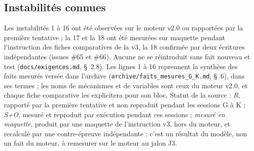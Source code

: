 \documentclass[11pt,a4paper]{article}
\begin{document}
\subsection*{Instabilités connues}
Les instabilités 1 à 16 ont été observées sur le moteur v2.0 ou rapportées par la première tentative ; la 17 et la 18 ont été mesurées sur maquette pendant l'instruction des fiches comparatives de la v3, la 18 confirmée par deux écritures indépendantes (issues \#65 et \#66). Aucune ne se réintroduit sans fait nouveau et test (\nolinkurl{docs/exigences.md}, \S~2.8). Les lignes 1 à 16 reprennent la synthèse des faits mesurés versée dans l'archive (\nolinkurl{archive/faits_mesures_G_K.md}, \S~6), dans ses termes ; les noms de mécanismes et de variables sont ceux du moteur v2.0, et chaque fiche comparative les explicitera pour son bloc. Statut de la source : \emph{R}, rapporté par la première tentative et non reproduit pendant les sessions G à K ; \emph{S+O}, mesuré et reproduit par exécution pendant ces sessions ; \emph{mesuré en maquette}, produit par une maquette de l'instruction v3, hors du moteur, et recalculé par une contre-épreuve indépendante : c'est un résultat du modèle, non un fait du moteur, à remesurer sur le moteur au jalon J3.
\end{document}
